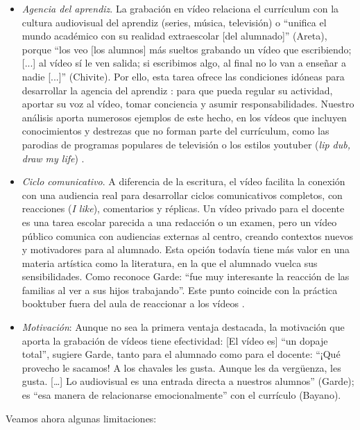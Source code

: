 \documentclass[spanish]{textolivre}
\begin{document}
\begin{itemize}
 \item \textit{Agencia del aprendiz}. La grabación en vídeo relaciona el currículum con la cultura audiovisual del aprendiz (series, música, televisión) o “unifica el mundo académico con su realidad extraescolar [del alumnado]” (Areta), porque “los veo [los alumnos] más sueltos grabando un vídeo que escribiendo; [...] al vídeo sí le ven salida; si escribimos algo, al final no lo van a enseñar a nadie [...]” (Chivite). Por ello, esta tarea ofrece las condiciones idóneas para desarrollar la agencia del aprendiz \cite{biesta_agency_2007}: para que pueda regular su actividad, aportar su voz al vídeo, tomar conciencia y asumir responsabilidades. Nuestro análisis aporta numerosos ejemplos de este hecho, en los vídeos que incluyen conocimientos y destrezas que no forman parte del currículum, como las parodias de programas populares de televisión o los estilos youtuber (\textit{lip dub, draw my life}) \cite{ogrady_developing_2022}.
 \item \textit{Ciclo comunicativo}. A diferencia de la escritura, el vídeo facilita la conexión con una audiencia real para desarrollar ciclos comunicativos completos, con reacciones (\textit{I like}), comentarios y réplicas. Un vídeo privado para el docente es una tarea escolar parecida a una redacción o un examen, pero un vídeo público comunica con audiencias externas al centro, creando contextos nuevos y motivadores para al alumnado. Esta opción todavía tiene más valor en una materia artística como la literatura, en la que el alumnado vuelca sus sensibilidades. Como reconoce Garde: “fue muy interesante la reacción de las familias al ver a sus hijos trabajando”. Este punto coincide con la práctica booktuber fuera del aula de reaccionar a los vídeos \cite{fialho_booktubers_2023,tomasena_glennie_booktubers_2020}.
 \item \textit{Motivación}: Aunque no sea la primera ventaja destacada, la motivación que aporta la grabación de vídeos tiene efectividad: [El vídeo es] “un dopaje total”, sugiere Garde, tanto para el alumnado como para el docente: “¡Qué provecho le sacamos! A los chavales les gusta. Aunque les da vergüenza, les gusta. […] Lo audiovisual es una entrada directa a nuestros alumnos” (Garde); es “esa manera de relacionarse emocionalmente” con el currículo (Bayano).
\end{itemize}

Veamos ahora algunas limitaciones:
\end{document}

